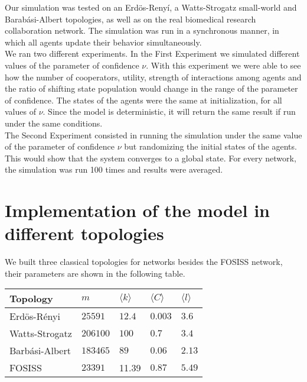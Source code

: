 \documentclass{bmcart}
\begin{document}
Our simulation was tested on an Erd\"{o}s-Reny\'i, a
Watts-Strogatz small-world and Barab\'asi-Albert topologies, as well
as on the real biomedical research collaboration network. The
simulation was run in a synchronous manner, in which all agents update their
behavior simultaneously. \\   

We ran two different experiments. In the First Experiment we simulated different
values of the parameter of confidence $\nu$. With this experiment we were able
to see how the number of cooperators, utility, strength of interactions
among agents and the ratio of shifting state population would change
in the range of the parameter of confidence. The states of the agents were
the same at initialization, for all values of $\nu$. Since the model is deterministic, it will return the same
result if run under the same conditions.\\

The Second Experiment consisted in running the simulation under the
same value of the parameter of confidence $\nu$ but randomizing the initial
states of the agents. This would show that the system converges to a
global state. For every network, the simulation was run 100 times and
results were averaged.

\section*{Implementation of the model in different topologies}

We built three classical topologies for networks besides the FOSISS network, their parameters are shown in the following table.\\


\begin{tabular}{| l |  l | l |l|l|}
\hline
\bf{Topology}       & $m$              & $\langle k \rangle$          & $\langle C \rangle$      & $\langle l \rangle$ \\ \hline
Erd\"{o}s-R\'enyi  &  $25591$      &  $12.4$        &  $0.003$ & $3.6$  \\ \hline
Watts-Strogatz    &  $206100$   &  $100$         &  $0.7$      & $3.4$  \\ \hline
Barb\'asi-Albert    &  $183465$   &  $89$           &  $0.06$    & $2.13$ \\ \hline
FOSISS                    &  $23391$     &   11.39     &  $0.87$    &  $5.49$ \\ \hline
\end{tabular}\\ 
\end{document}
